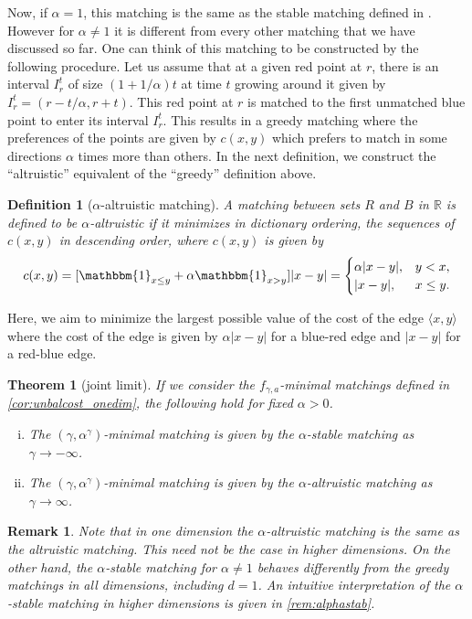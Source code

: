 \documentclass{article}
\newtheorem{theorem}{Theorem}[section]
\newtheorem{remark}{Remark}
\newtheorem{definition}{Definition}
\newcommand{\R}{\mathbb{R}}
\begin{document}
Now, if $\alpha=1$, this matching is the same as the stable matching
defined in \cite{galeshapley,minimal}. However for $\alpha\neq 1$ it
is different from every other matching that we have discussed so far.
One can think of this matching to be constructed by the following
procedure. Let us assume that at a given red point at $r$, there is an
interval $I_r^t$ of size $(1+1/\alpha)t$ at time $t$ growing around it given by
$I_r^t=(r-t/\alpha ,r+t)$. This red point at $r$ is matched to the first unmatched
blue point to enter its interval $I_r^t$. This results in a greedy matching where the preferences of the points are
given by $c(x,y)$ which prefers to match in some directions $\alpha$
times more than
others.
In the next definition, we construct the ``altruistic'' equivalent of the
``greedy'' definition above.

\begin{definition}[$\alpha$-altruistic matching] \label{def:alphaalt}
A matching between sets $R$ and $B$ in $\R$ is defined to be
$\alpha$-altruistic if it minimizes in dictionary ordering, the
  sequences of $c(x,y)$ in descending order, where $c(x,y)$ is given
  by
    \[c(x,y) = [\mathbbm{1}_{x\leq
  y}+\alpha\mathbbm{1}_{x>y}]|x-y| = \begin{cases} \alpha|x-y|, &
  y<x, \\ |x-y|, & x\leq y.\end{cases} \]
\end{definition}

Here, we aim to minimize the largest possible value of the cost of the
edge $\langle x,y \rangle$ where the cost of the edge is given by
$\alpha|x-y|$ for a blue-red edge and $|x-y|$ for a red-blue edge.

\begin{theorem}[joint limit]\label{thm:weirdlim} If we consider the
  $f_{\gamma,a}$-minimal matchings defined in
  \cref{cor:unbalcost_onedim}, the following hold for fixed $\alpha>0$.
  \begin{enumerate}[(i)]
  \item The $(\gamma,\alpha^\gamma)$-minimal matching is given by the
  $\alpha$-stable matching as $\gamma\rightarrow-\infty$.
  \item The $(\gamma,\alpha^\gamma)$-minimal matching is given by the
  $\alpha$-altruistic matching as $\gamma\rightarrow\infty$.
  \end{enumerate}
\end{theorem}

\begin{remark}
Note that in one dimension the $\alpha$-altruistic matching is the
same as the altruistic matching. This need not be the case in higher
dimensions. On the other hand, the $\alpha$-stable matching for
$\alpha\neq 1$ behaves
differently from the greedy matchings in all dimensions, including
$d=1$. An intuitive interpretation of the $\alpha$-stable matching in
higher dimensions is
given in \cref{rem:alphastab}.
\end{remark}
\end{document}

